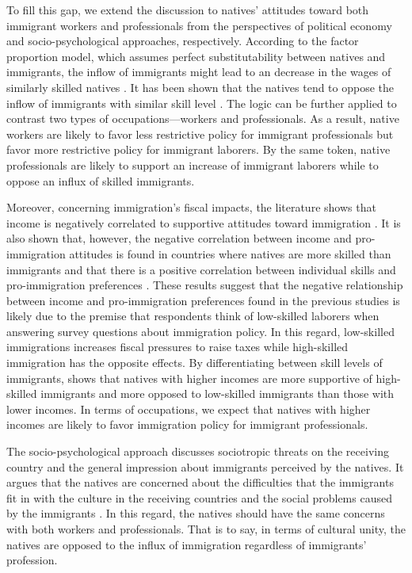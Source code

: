 \documentclass[12pt]{article}
\begin{document}
To fill this gap, we extend the discussion to natives' attitudes toward both immigrant workers and professionals from the perspectives of political economy and socio-psychological approaches, respectively. According to the factor proportion model, which assumes perfect substitutability between natives and immigrants, the inflow of immigrants might lead to an decrease in the wages of similarly skilled natives \citep{ScheveSlaughter2001}. It has been shown that the natives tend to oppose the inflow of immigrants with similar skill level \citep{HansonScheveSlaughter2007}. The logic can be further applied to contrast two types of occupations---workers and professionals. As a result, native workers are likely to favor less restrictive policy for immigrant professionals but favor more restrictive policy for immigrant laborers. By the same token, native professionals are likely to support an increase of immigrant laborers while to oppose an influx of skilled immigrants. 


Moreover, concerning immigration's fiscal impacts, the literature shows that income is negatively correlated to supportive attitudes toward immigration \citep{DustmannPreston2006, DustmannPreston2007}. It is also shown that, however, the negative correlation between income and pro-immigration attitudes is found in countries where natives are more skilled than immigrants and that there is a positive correlation between individual skills and pro-immigration preferences \citep{FacchiniMayda2006}. These results suggest that the negative relationship between income and pro-immigration preferences found in the previous studies is likely due to the premise that respondents think of low-skilled laborers when answering survey questions about immigration policy. In this regard, low-skilled immigrations increases fiscal pressures to raise taxes while high-skilled immigration has the opposite effects. By differentiating between skill levels of immigrants, \cite{Hansonetal2007} shows that natives with higher incomes are more supportive of high-skilled immigrants and more opposed to low-skilled immigrants than those with lower incomes. In terms of occupations, we expect that natives with higher incomes are likely to favor immigration policy for immigrant professionals.


The socio-psychological approach discusses sociotropic threats on the receiving country and the general impression about immigrants perceived by the natives. It argues that the natives are concerned about the difficulties that the immigrants fit in with the culture in the receiving countries and the social problems caused by the immigrants \citep[e.g.,][]{Snidermanetal2004}. In this regard, the natives should have the same concerns with both workers and professionals. That is to say, in terms of cultural unity, the natives are opposed to the influx of immigration regardless of immigrants' profession.
\end{document}
